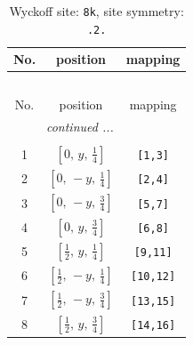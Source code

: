\documentclass[fleqn,8pt]{jsarticle}
\begin{document}
\begin{longtable}{ccc}
\caption{Wyckoff site: {\tt 8k}, site symmetry: {\tt .2.}}
 \\
 \hline \hline
No. & position & mapping \\ \hline \endfirsthead

\multicolumn{2}{l}{\tablename\ \thetable{}} \\
 \hline \hline
No. & position & mapping \\ \hline \endhead

 \hline \hline
\multicolumn{2}{r}{\footnotesize\it continued ...} \\ \endfoot

 \hline \hline
\multicolumn{2}{r}{} \\ \endlastfoot

1 & $\left[ 0,\, y,\, \frac{1}{4} \right]$ & {\tt [1,3]} \\ \hline
2 & $\left[ 0,\, - y,\, \frac{1}{4} \right]$ & {\tt [2,4]} \\ \hline
3 & $\left[ 0,\, - y,\, \frac{3}{4} \right]$ & {\tt [5,7]} \\ \hline
4 & $\left[ 0,\, y,\, \frac{3}{4} \right]$ & {\tt [6,8]} \\ \hline
5 & $\left[ \frac{1}{2},\, y,\, \frac{1}{4} \right]$ & {\tt [9,11]} \\ \hline
6 & $\left[ \frac{1}{2},\, - y,\, \frac{1}{4} \right]$ & {\tt [10,12]} \\ \hline
7 & $\left[ \frac{1}{2},\, - y,\, \frac{3}{4} \right]$ & {\tt [13,15]} \\ \hline
8 & $\left[ \frac{1}{2},\, y,\, \frac{3}{4} \right]$ & {\tt [14,16]} \\
\end{longtable}
\renewcommand{\arraystretch}{1.2}
\end{document}
